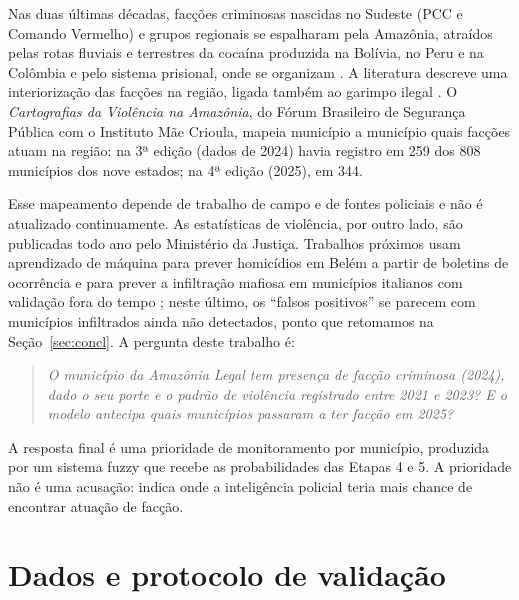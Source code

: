 \documentclass[10pt,a4paper,twocolumn]{article}
\begin{document}
Nas duas últimas décadas, facções criminosas nascidas no Sudeste (PCC e Comando Vermelho)
e grupos regionais se espalharam pela Amazônia, atraídos pelas rotas fluviais e terrestres
da cocaína produzida na Bolívia, no Peru e na Colômbia \cite{r11} e pelo sistema prisional,
onde se organizam \cite{r10}. A literatura descreve uma interiorização das facções na
região, ligada também ao garimpo ilegal \cite{r12,r13}. O \emph{Cartografias da Violência
na Amazônia}, do Fórum Brasileiro de Segurança Pública com o Instituto Mãe Crioula, mapeia
município a município quais facções atuam na região: na 3ª edição (dados de 2024) havia
registro em 259 dos 808 municípios dos nove estados; na 4ª edição (2025), em 344.

Esse mapeamento depende de trabalho de campo e de fontes policiais e não é atualizado
continuamente. As estatísticas de violência, por outro lado, são publicadas todo ano pelo
Ministério da Justiça. Trabalhos próximos usam aprendizado de máquina para prever
homicídios em Belém a partir de boletins de ocorrência \cite{r16} e para prever a
infiltração mafiosa em municípios italianos com validação fora do tempo \cite{r17}; neste
último, os ``falsos positivos'' se parecem com municípios infiltrados ainda não detectados,
ponto que retomamos na Seção~\ref{sec:concl}. A pergunta deste trabalho é:

\begin{quote}\itshape
O município da Amazônia Legal tem presença de facção criminosa (2024), dado o seu porte e
o padrão de violência registrado entre 2021 e 2023? E o modelo antecipa quais municípios
passaram a ter facção em 2025?
\end{quote}

A resposta final é uma prioridade de monitoramento por município, produzida por um sistema
fuzzy que recebe as probabilidades das Etapas 4 e 5. A prioridade não é uma
acusação: indica onde a inteligência policial teria mais chance de encontrar atuação de
facção.

\section{Dados e protocolo de validação}
\end{document}
